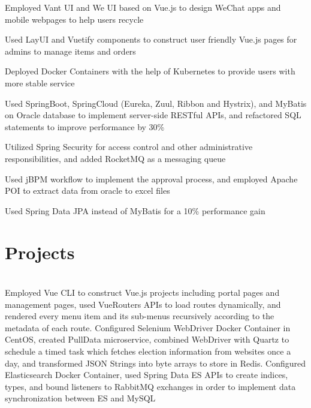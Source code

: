 \documentclass[]{deedy-resume-openfont}
\begin{document}
\begin{tightemize}
	\item Employed Vant UI and We UI based on Vue.js to design WeChat apps and mobile webpages to help users recycle
	\item Used LayUI and Vuetify components to construct user friendly Vue.js pages for admins to manage items and orders
	\item Deployed Docker Containers with the help of Kubernetes to provide users with more stable service
	\item Used SpringBoot, SpringCloud (Eureka, Zuul, Ribbon and Hystrix), and MyBatis on Oracle database to implement server-side RESTful APIs, and refactored SQL statements to improve performance by 30\%
	\item Utilized Spring Security for access control and other administrative responsibilities, and added RocketMQ as a messaging queue
	\item Used jBPM workflow to implement the approval process, and employed Apache POI to extract data from oracle to excel files
	\item Used Spring Data JPA instead of MyBatis for a 10\% performance gain
\end{tightemize}
\sectionsep
%
%
\section{Projects}
\raggedright

\hfill {}\\
Employed Vue CLI to construct Vue.js projects including portal pages and management pages, used VueRouter\textquotesingle{}s APIs to load routes dynamically, and rendered every menu item and its sub-menus recursively according to the metadata of each route. Configured Selenium WebDriver Docker Container in CentOS, created PullData microservice, combined WebDriver with Quartz to schedule a timed task which fetches election information from websites once a day, and transformed JSON Strings into byte arrays to store in Redis. Configured Elasticsearch Docker Container, used Spring Data ES APIs to create indices, types, and bound listeners to RabbitMQ exchanges in order to implement data synchronization between ES and MySQL\\
\sectionsep
  

    
\end{document}
